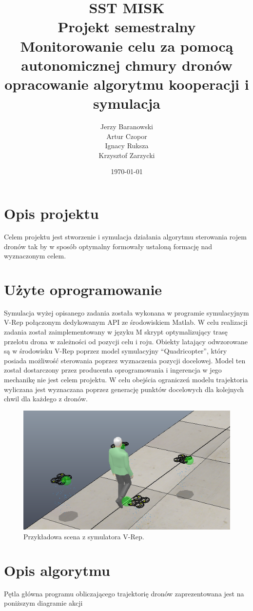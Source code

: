 \documentclass[a4paper, 11pt, oneside]{article}
\title{%
  SST MISK \\Projekt semestralny \\
  \vspace{5mm}
  \large Monitorowanie celu za pomocą autonomicznej chmury dronów\\
  opracowanie algorytmu kooperacji i symulacja}
\author{Jerzy Baranowski\\Artur Czopor\\Ignacy Ruksza \\Krzysztof Zarzycki }
\date{\today}
\begin{document}
\maketitle
\newpage
\section{Opis projektu}
Celem projektu jest stworzenie i symulacja działania algorytmu sterowania rojem dronów tak by w sposób optymalny formowały ustaloną formację nad wyznaczonym celem. 
\section{Użyte oprogramowanie}

Symulacja wyżej opisanego zadania została wykonana w programie symulacyjnym V-Rep połączonym dedykowanym API ze środowiskiem Matlab. W celu realizacji zadania został zaimplementowany w języku M skrypt optymalizujący trasę przelotu drona w zależności od pozycji celu i roju.  Obiekty latający odwzorowane są w środowisku V-Rep poprzez model symulacyjny “Quadricopter”, który posiada możliwość sterowania poprzez wyznaczenia pozycji docelowej. Model ten został dostarczony przez producenta oprogramowania i ingerencja w jego mechanikę nie jest celem projektu. W celu obejścia ograniczeń modelu trajektoria wyliczana jest wyznaczana poprzez generację punktów docelowych dla kolejnych chwil dla każdego z dronów.

\begin{figure}[H]
\centering
\includegraphics[scale=0.5]{simulation1.png}
\caption{Przykładowa scena z symulatora V-Rep.}

\end{figure}

\section{Opis algorytmu}
Pętla główna programu obliczającego trajektorię dronów zaprezentowana jest na poniższym diagramie akcji
\end{document}
